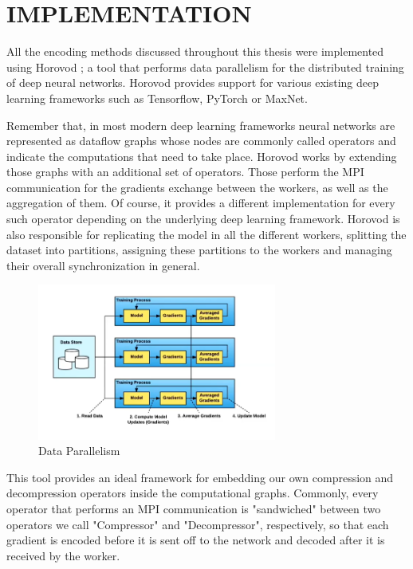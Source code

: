 \chapter{IMPLEMENTATION}

    All the encoding methods discussed throughout this thesis were implemented using Horovod \cite{alex2018horovod}; a tool that performs data parallelism for the distributed training of deep neural networks.
    Horovod provides support for various existing deep learning frameworks such as Tensorflow, PyTorch or MaxNet.
    
    Remember that, in most modern deep learning frameworks neural networks are represented as dataflow graphs whose nodes are commonly called operators and indicate the computations that need to take place.
    Horovod works by extending those graphs with an additional set of operators. Those perform the MPI communication for the gradients exchange between the workers, as well as the aggregation of them.
    Of course, it provides a different implementation for every such operator depending on the underlying deep learning framework.
    Horovod is also responsible for replicating the model in all the different workers, splitting the dataset into partitions, assigning these partitions to the workers and managing their overall synchronization in general. 
    
    \begin{figure}[h]
    \centering
    \includegraphics[width=0.7\textwidth]{thesis/figures/DataParallelism.png}
    \caption{Data Parallelism}
    \end{figure}

    This tool provides an ideal framework for embedding our own compression and decompression operators inside the computational graphs.
    Commonly, every operator that performs an MPI communication is "sandwiched" between two operators we call "Compressor" and "Decompressor", respectively, so that each gradient is encoded before it is sent off to the network and decoded after it is received by the worker.

